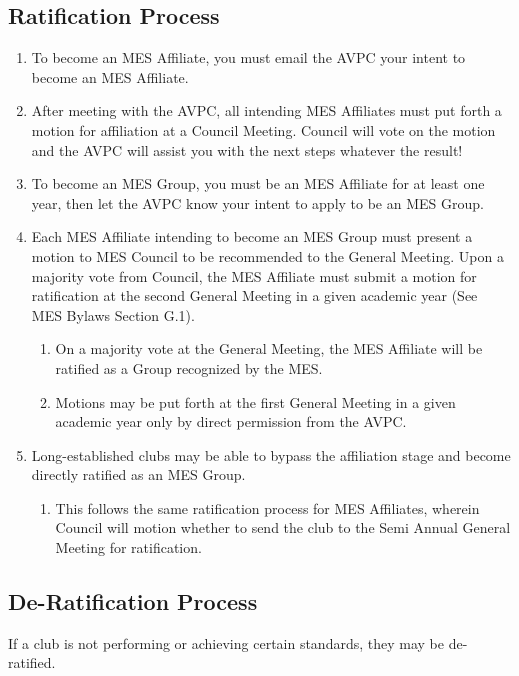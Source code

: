 \hypertarget{ratification-process}{%
 \subsection{Ratification Process}
 \label{ratification-process}}
\begin{enumerate}
 \item
  To become an MES Affiliate, you must email the AVPC your intent to
  become an MES Affiliate.
 \item
  After meeting with the AVPC, all intending MES Affiliates must put
  forth a motion for affiliation at a Council Meeting. Council will vote
  on the motion and the AVPC will assist you with the next steps
  whatever the result!
 \item
  To become an MES Group, you must be an MES Affiliate for at least one
  year, then let the AVPC know your intent to apply to be an MES Group.
 \item
  Each MES Affiliate intending to become an MES Group must present a
  motion to MES Council to be recommended to the General Meeting. Upon a
  majority vote from Council, the MES Affiliate must submit a motion for
  ratification at the second General Meeting in a given academic year
  (See MES Bylaws Section G.1).

  \begin{enumerate}
   \item
    On a majority vote at the General Meeting, the MES Affiliate will be
    ratified as a Group recognized by the MES.
   \item
    Motions may be put forth at the first General Meeting in a given
    academic year only by direct permission from the AVPC.
  \end{enumerate}
 \item
  Long-established clubs may be able to bypass the affiliation stage and
  become directly ratified as an MES Group.

  \begin{enumerate}
   \item
    This follows the same ratification process for MES Affiliates,
    wherein Council will motion whether to send the club to the Semi
    Annual General Meeting for ratification.
  \end{enumerate}

\end{enumerate}

\hypertarget{de-ratification-process}{%
 \subsection{De-Ratification Process}
 \label{de-ratification-process}}
If a club is not performing or achieving certain standards, they may be
de-ratified.

